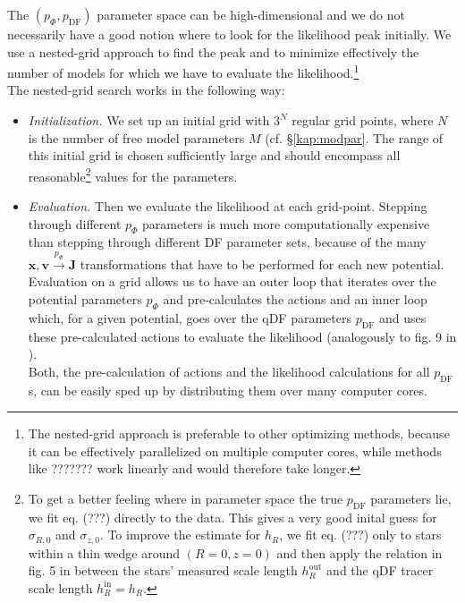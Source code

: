 \documentclass[12pt,preprint]{aastex}
\newcommand{\vect}[1]{\boldsymbol{#1}} %
\begin{document}
The $(p_\Phi,p_\text{DF})$ parameter space can be high-dimensional and we do not necessarily have a good notion where to look for the likelihood peak initially. We use a nested-grid approach to find the peak and to minimize effectively the number of models for which we have to evaluate the likelihood.\footnote{The nested-grid approach is preferable to other optimizing methods, because it can be effectively parallelized on multiple computer cores, while methods like ??????? work linearly and would therefore take longer.}
\\The nested-grid search works in the following way: 
\begin{itemize}

\item \emph{Initialization.} We set up an initial grid with $3^N$ regular grid points, where $N$ is the number of free model parameters $M$ (cf. \S\ref{kap:modpar}. The range of this initial grid is chosen sufficiently large and should encompass all reasonable\footnote{To get a better feeling where in parameter space the true $p_\text{DF}$ parameters lie, we fit eq. (???) directly to the data. This gives a very good inital guess for $\sigma_{R,0}$ and $\sigma_{z,0}$. To improve the estimate for $h_R$, we fit eq. (???) only to stars within a thin wedge around $(R=0,z=0)$ and then apply the relation in fig. 5 in \citet{bo13} between the stars' measured scale length $h_R^\text{out}$ and the qDF tracer scale length $h_R^\text{in}=h_R$.} values for the parameters. 

\item  \emph{Evaluation.} Then we evaluate the likelihood at each grid-point. Stepping through different $p_\Phi$ parameters is much more computationally expensive than stepping through different DF parameter sets, because of the many $\vect{x},\vect{v} \overset{p_\Phi}{\longrightarrow} \vect{J}$ transformations that have to be performed for each new potential. Evaluation on a grid allows us to have an outer loop that iterates over the potential parameters $p_\Phi$ and pre-calculates the actions and an inner loop which, for a given potential, goes over the qDF parameters $p_\text{DF}$ and uses these pre-calculated actions to evaluate the likelihood (analogously to fig. 9 in \citet{bo13}).
\\Both, the pre-calculation of actions and the likelihood calculations for all $p_\text{DF}$s, can be easily sped up by distributing them over many computer cores.


\end{itemize}
\end{document}
